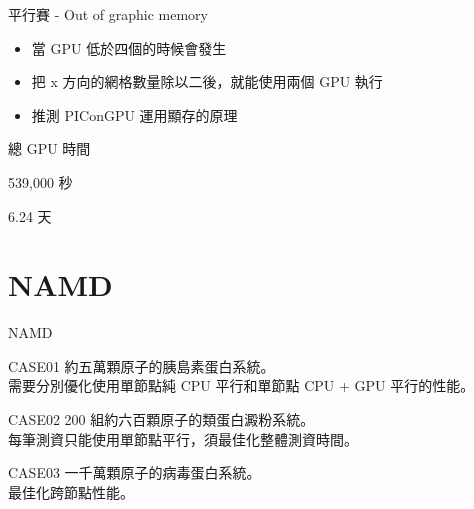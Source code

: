 \documentclass[aspectratio=169]{beamer}
\begin{document}
        \begin{frame}{平行賽 - Out of graphic memory}
            \begin{itemize}
                \item 當 GPU 低於四個的時候會發生 
                \newline
                \item 把 x 方向的網格數量除以二後，就能使用兩個 GPU 執行
                \newline
                \item 推測 PIConGPU 運用顯存的原理
            \end{itemize}
        \end{frame}
                   
        \begin{frame}{總 GPU 時間}
            \centering
            \begin{Large}
                539,000 秒
                \newline
                \newline
            \end{Large}

            \centering
            \begin{Huge}
                6.24 天
            \end{Huge}
        \end{frame}

    \section{NAMD}
    
    \begin{frame}{NAMD}
        \begin{block}{CASE01}
            約五萬顆原子的胰島素蛋白系統。 \\
            需要分別優化使用單節點純 CPU 平行和單節點 CPU + GPU 平行的性能。
        \end{block}

        \begin{block}{CASE02}
            200 組約六百顆原子的類蛋白澱粉系統。 \\
            每筆測資只能使用單節點平行，須最佳化整體測資時間。
        \end{block}

        \begin{block}{CASE03}
            一千萬顆原子的病毒蛋白系統。\\
            最佳化跨節點性能。
        \end{block}
    \end{frame}
\end{document}

